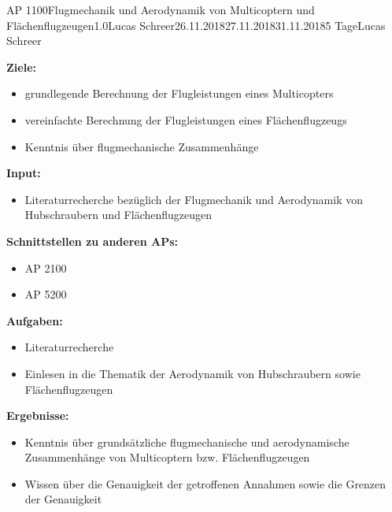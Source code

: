 \begin{appendix}
\clearpage
\begin{wpd}{AP 1100}{Flugmechanik und Aerodynamik von Multicoptern und Flächenflugzeugen}{1.0}{Lucas Schreer}{26.11.2018}{27.11.2018}{31.11.2018}{5 Tage}{Lucas Schreer}
    {
    \textbf{Ziele:}
    \begin{itemize}
        \item grundlegende Berechnung der Flugleistungen eines Multicopters
        \item vereinfachte Berechnung der Flugleistungen eines Flächenflugzeugs
        \item Kenntnis über flugmechanische Zusammenhänge
    \end{itemize}
    \textbf{Input:}
    \begin{itemize}
        \item Literaturrecherche bezüglich der Flugmechanik und Aerodynamik von Hubschraubern und Flächenflugzeugen
    \end{itemize}
    \textbf{Schnittstellen zu anderen APs:}
    \begin{itemize}
        \item AP 2100
        \item AP 5200
    \end{itemize}
    \textbf{Aufgaben:}
    \begin{itemize}
        \item Literaturrecherche
        \item Einlesen in die Thematik der Aerodynamik von Hubschraubern sowie Flächenflugzeugen
    \end{itemize}
    \textbf{Ergebnisse:}
    \begin{itemize}
        \item Kenntnis über grundsätzliche flugmechanische und aerodynamische Zusammenhänge von Multicoptern bzw. Flächenflugzeugen
        \item Wissen über die Genauigkeit der getroffenen Annahmen sowie die Grenzen der Genauigkeit
    \end{itemize}
    }
\end{wpd}



\end{appendix}
